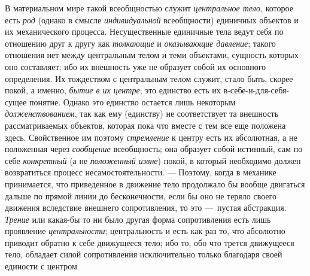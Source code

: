 \documentclass[twoside]{article}
\begin{document}
{{{{{В материальном мире такой всеобщностью служит
{\em центральное тело},
которое есть {\em род}
(однако в смысле
{\em индивидуальной}
всеобщности) единичных объектов и их механического процесса.
Несущественные единичные тела ведут себя по отношению друг к другу как
{\em толкающие} и
{\em оказывающие давление};
такого отношения нет между центральным телом и теми
объектами, сущность которых оно составляет; ибо их внешность уже не
образует собой их основного определения. Их тождеством с центральным телом
служит, стало быть, скорее покой, а именно,
{\em бытие в их центре};
это единство есть их в-себе-и-для-себя-сущее понятие. Однако
это единство остается лишь некоторым
{\em долженствованием},
так как ему (единству) не соответствует та внешность
рассматриваемых объектов, которая пока что вместе с тем все еще положена
здесь. Свойственное им поэтому
{\em стремление} к центру
есть их абсолютная, а не положенная через
{\em сообщение}
всеобщность; она образует собой истинный, сам по себе
{\em конкретный} (а не
{\em положенный извне})
покой, в который необходимо должен возвратиться процесс
несамостоятельности. — Поэтому, когда в механике
принимается, что приведенное в движение тело продолжало бы вообще двигаться
дальше по прямой линии до бесконечности, если бы оно не теряло своего
движения вследствие внешнего сопротивления, то это —~пустая
абстракция. {\em Трение}
или какая-бы то ни было другая форма
сопротивления есть лишь проявление
{\em центральности};
центральность и есть как раз то, что абсолютно приводит
обратно к себе движущееся тело; ибо то, обо что трется движущееся тело,
обладает силой сопротивления исключительно только благодаря своей единости
с
центром~}}}}}
\end{document}
